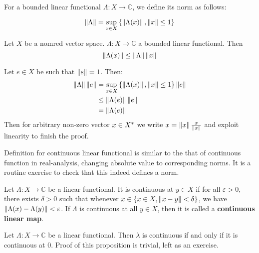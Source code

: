 \begin{definition}\rm\nextline
	For a bounded linear functional $\Lambda:X\xrightarrow{}\mathbb{C}$, we define its norm as follows:

	$$
		\left\|{\Lambda}\right\|=\sup_{x\in X}{\left\{\left\|{\Lambda(x)}\right\|,\left\|{x}\right\|\leq1\right\}}
	$$
\end{definition}

\begin{proposition}\rm\nextline
	Let $X$ be a nomred vector space. $\Lambda:X\xrightarrow{}\mathbb{C}$ a bounded linear functional.
	Then
	$$
		\left\|{\Lambda(x)}\right\|\leq\left\|{\Lambda}\right\|\left\|{x}\right\|
	$$
	\begin{pf}{}{}
	Let $e\in X$ be such that $\left\|{e}\right\|=1$.
	Then:
	\begin{equation}
		\begin{split}
			\left\|{\Lambda}\right\|\left\|{e}\right\|&=\sup_{x\in X}{\left\{\left\|{\Lambda(x)}\right\|,\left\|{x}\right\|\leq1\right\}}\left\|{e}\right\|\\
			&\leq \left\|{\Lambda(e)}\right\|\left\|{e}\right\|\\
			&=\left\|{\Lambda(e)}\right\|
		\end{split}
	\end{equation}
	Then for arbitrary non-zero vector $x\in{X}^*$ we write $x=\left\|{x}\right\|\frac{x}{\left\|{x}\right\|}$ and exploit linearity to finish the proof.
\end{pf}
\end{proposition}
Definition for continuous linear functional is similar to the that of continuous function in real-analysis, changing absolute value to corresponding norms. It is a routine exercise to check that this indeed defines a norm.

\begin{definition}\rm\nextline
	Let $\Lambda:X\xrightarrow{}\mathbb{C}$ be a linear functional. It is continuous at $y\in X$ if for all $\varepsilon>0$, there exists $\delta>0$ such that whenever $x\in\{x\in X, \left\|{x-y}\right\|<\delta\}$, we have $\left\|{\Lambda(x)-\Lambda(y)}\right\|<\varepsilon$. If $\Lambda$ is continuous at all $y\in X$, then it is called a {\bf continuous linear map}.


\end{definition}

\begin{proposition}\rm\nextline
	Let $\Lambda:X\xrightarrow{}\mathbb{C}$ be a linear functional. Then $\lambda$ is continuous if and only if it is continuous at 0. Proof of this proposition is trivial, left as an exercise.

\end{proposition}

